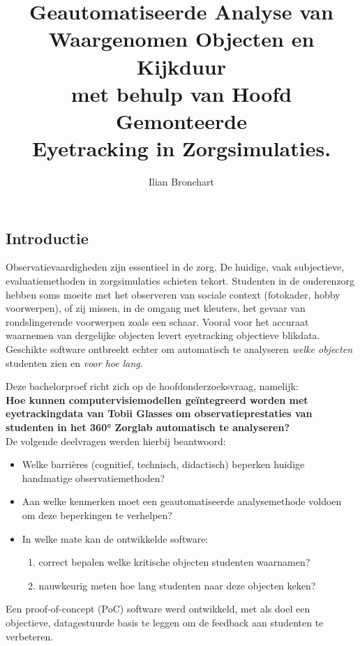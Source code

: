 \documentclass[a0,portrait]{hogent-poster}
\title{Geautomatiseerde Analyse van Waargenomen Objecten en Kijkduur\\ met behulp van Hoofd Gemonteerde\\ Eyetracking in Zorgsimulaties.}
\author{Ilian Bronchart}
\begin{document}
\maketitle

\begin{multicols}{2} %

\section{Introductie}
Observatievaardigheden zijn essentieel in de zorg. 
De huidige, vaak subjectieve, evaluatiemethoden in zorgsimulaties schieten tekort. 
Studenten in de ouderenzorg hebben soms moeite met het observeren van sociale context (fotokader, hobby voorwerpen), 
of zij missen, in de omgang met kleuters, het gevaar van rondslingerende voorwerpen zoals een schaar. 
Vooral voor het accuraat waarnemen van dergelijke objecten levert eyetracking objectieve blikdata. 
Geschikte software ontbreekt echter om automatisch te analyseren \textit{welke objecten} studenten zien en \textit{voor hoe lang}.

Deze bachelorproef richt zich op de hoofdonderzoeksvraag, namelijk:\\ \textbf{Hoe kunnen computervisiemodellen geïntegreerd worden met eyetrackingdata van Tobii Glasses om observatieprestaties van studenten in het 360° Zorglab automatisch te analyseren?} \\
De volgende deelvragen werden hierbij beantwoord:
\begin{itemize}
  \item Welke barrières (cognitief, technisch, didactisch) beperken huidige handmatige observatiemethoden?
  \item Aan welke kenmerken moet een geautomatiseerde analysemethode voldoen om deze beperkingen te verhelpen?
  \item In welke mate kan de ontwikkelde software:
    \begin{enumerate}
      \item correct bepalen welke kritische objecten studenten waarnamen?
      \item nauwkeurig meten hoe lang studenten naar deze objecten keken?
    \end{enumerate}
\end{itemize}
Een proof-of-concept (PoC) software werd ontwikkeld, met als doel een objectieve, datagestuurde basis te leggen om de feedback aan studenten te verbeteren.


\end{multicols}
\end{document}

